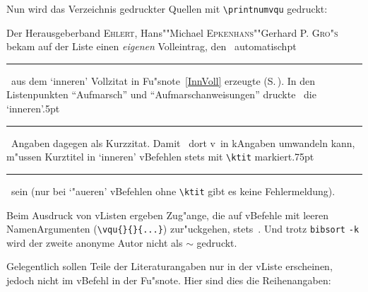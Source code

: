 \documentclass[12pt,a4paper]{article}
\newcommand{\pdfko}[1]{\kern #1pt
                              \rule[-0.4ex]{0.8pt}{0ex}\kern -0.8pt
                          \strut\ignorespaces}%
\begin{document}
\vspace{1.5ex}\noindent
Nun wird das Verzeichnis gedruckter Quellen mit \verb|\printnumvqu| gedruckt:


\printnumvqu

\noindent
Der Herausgeberband 
\textsc{Ehlert}, Hans\baslash""Michael \textsc{Epkenhans}\baslash""Gerhard P.
\textsc{Gro"s} 
bekam auf der Liste einen \textit{eigenen} Volleintrag, den \BibArts\ automatisch\pdfko{1}\  
aus dem `inneren' Vollzitat in Fu"snote~\ref{InnVoll} erzeugte 
(S.\,\pageref{InnVoll}). In den Listenpunkten "`Aufmarsch"' und 
"`Aufmarschanweisungen"' druckte \BibArts\ die `inneren'\pdfko{.5}\ 
Angaben dagegen als Kurzzitat. Damit \BibArts\ dort v\hy\ in k\fhy Angaben 
umwandeln kann, m"ussen Kurztitel in `inneren' v\fhy Befehlen stets mit 
\verb|\ktit| markiert\pdfko{.75}\  
sein (nur bei `"au\hyss eren' v\fhy Befehlen ohne \verb|\ktit| gibt es keine Fehlermeldung). 

Beim Ausdruck von v\fhy Listen ergeben Zug"ange, die auf v\fhy Befehle mit leeren 
Namen\hy Argumenten (\verb|\vqu{}{}{...}|) zur"uckgehen, stets \printonlyvqu{}{}{...}\,. 
Und trotz \hspace{.1em}\verb|bibsort| \verb|-k| \hspace{.1em}wird der zweite anonyme Autor nicht als $\sim$ gedruckt.


\vspace{2ex}\noindent
Gelegentlich sollen Teile der Literaturangaben nur in der v\fhy Liste erscheinen, jedoch 
nicht im v\fhy Befehl in der Fu"snote. Hier sind dies die Reihenangaben:
\end{document}
